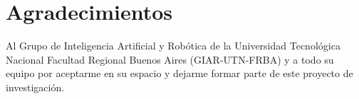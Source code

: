 \chapter*{Agradecimientos}

\noindent Al Grupo de Inteligencia Artificial y Robótica de la Universidad Tecnológica Nacional Facultad Regional Buenos Aires (GIAR-UTN-FRBA) y a todo su equipo por aceptarme en su espacio y dejarme formar parte de este proyecto de investigación.
